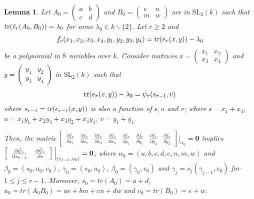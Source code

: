 \documentclass[10pt,a4paper]{amsart}
\newtheorem{lemma}{Lemma}
\newcommand{\SL}{\mathrm{SL}}
\newcommand{\tr}{\mathrm{tr}}
\begin{document}
\begin{lemma}{\label{tr 2}}
Let $A_0 = \left (\begin{array}{cc} a  & b \\ c & d \end{array}\right)$ and $B_0=\left (\begin{array}{cc} e & n \\
m & w  \end{array}\right )$ are in $\SL_2(k)$ such that $\tr(\Bar{e}_r(A_0, B_0)) = \lambda_0$ for some $\lambda_0\in k\backslash\{2\}$. Let $r\geq 2$ and  $$f_r(x_1, x_2, x_3, x_4, y_1, y_2, y_3, y_4) = \tr(\Bar{e}_r(x,y))-\lambda_0$$ be a polynomial in $8$ variables over $k$. Consider matrices $x=\left (\begin{array}{cc} x_1  & x_2 \\
        x_3 & x_4
\end{array}\right)$ and $y=\left (\begin{array}{cc}
       y_1  & y_2 \\
        y_3 & y_4
\end{array}\right)$ in $\SL_2(k)$ such that $$\tr(\Bar{e}_r(x,y))-\lambda_0=\Tilde{\psi}_r(s_{r-1},v)$$ where $s_{r-1} = \tr(\Bar{e}_{r-1}(x,y))$ is also a function of $s,u$ and $v$; where $s=x_1+x_4$, $u=x_1y_1+x_2y_3+x_3y_2+x_4y_4$, $v=y_1+y_4$. 
    
Then, the matrix $\left[\begin{array}{cccccccc}
\frac{\partial f_r}{\partial x_1} & \frac{\partial f_r}{\partial x_2} & \frac{\partial f_r}{\partial x_3} & \frac{\partial f_r}{\partial x_4} & \frac{\partial f_r}{\partial y_1} & \frac{\partial f_r}{\partial y_2} & \frac{\partial f_r}{\partial y_3} & \frac{\partial f_r}{\partial y_4}
\end{array}\right]\Big|_{\alpha_0} = \mathbf{0}$ implies $\left[\begin{array}{ccc}
\frac{\partial\Tilde{\psi}_r}{\partial s_{r-1}} & \frac{\partial\Tilde{\psi}_r}{\partial v}  \end{array}\right]\Big |_{(\gamma_{r-1},v_0)}=\mathbf{0}$; where $\alpha_0=(a,b,c,d,e,n,m,w)$ and $\beta_0=(s_0,u_0,v_0)$, $\gamma_0=(s_0,u_0)$, $\beta_0=(\gamma_0,v_0)$ and $\gamma_j=s_j(\gamma_{j-1},v_0)$ for $1\leq j\leq r-1$. Moreover, $s_0 = tr(A_0) = a+d$, $u_0 = tr(A_0B_0) = ae+bm+cn+dw$ and $v_0=tr(B_0)=e+w$.
\end{lemma}
\end{document}
